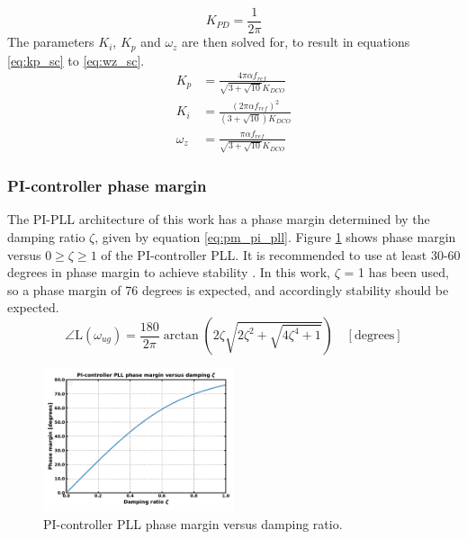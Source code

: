 			\begin{equation}
				K_{PD} = \frac{1}{2\pi}
			\end{equation}
			The parameters $K_i$, $K_p$ and $\omega_z$ are then solved for, to result in equations \ref{eq:kp_sc} to \ref{eq:wz_sc}.
			\begin{align}
				K_p & = \frac{4\pi\alpha f_{ref}}{\sqrt{3+\sqrt{10}}K_{DCO}}\label{eq:kp_sc}\\
				K_i & = \frac{(2\pi\alpha f_{ref})^2}{(3+\sqrt{10})K_{DCO}}\\
				\omega_z &= \frac{\pi\alpha f_{ref}}{\sqrt{3+\sqrt{10}}K_{DCO}}\label{eq:wz_sc}
			\end{align}

		\subsubsection{PI-controller phase margin}\label{pi_phase_margin}
			The PI-PLL architecture of this work has a phase margin determined by the damping ratio $\zeta$, given by equation \ref{eq:pm_pi_pll}. Figure \ref{fig:phase_margin} shows phase margin versus $0 \geq \zeta \geq 1$ of the PI-controller PLL. It is recommended to use at least 30-60 degrees in phase margin to achieve stability \cite{ogata_2010_stability}. In this work, $\zeta$ = 1 has been used, so a phase margin of 76 degrees is expected, and accordingly stability should be expected.
			\begin{equation}\label{eq:pm_pi_pll}
				\angle \text{L}(\omega_{ug}) = \frac{180}{2\pi}\arctan\left(2\zeta\sqrt{2\zeta^2 + \sqrt{4\zeta^4+1}}\right)\hspace{1em}[\text{degrees}]
			\end{equation}
			\begin{figure}[htb!]
				\center\includegraphics[width=0.5\textwidth, angle=0]{figs/damping_vs_pm.pdf}
				\caption{PI-controller PLL phase margin versus damping ratio.}
				\label{fig:phase_margin}
			\end{figure}



